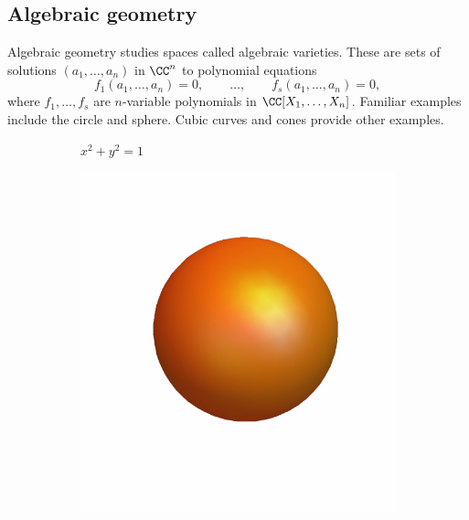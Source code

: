 \documentclass[12pt]{amsart}
\theoremstyle{plain}
\begin{document}
\subsection*{Algebraic geometry}
Algebraic geometry studies spaces called algebraic varieties.
These are sets of solutions $(a_1, \ldots, a_n)$ in $\CC^n$ to polynomial equations
$$f_1(a_1, \ldots, a_n) = 0, \qquad \ldots, \qquad f_s(a_1, \ldots, a_n) = 0,$$
where $f_1, \ldots, f_s$ are  $n$-variable polynomials in $\CC[X_1, \ldots, X_n]$.
Familiar examples include the circle and sphere.
Cubic curves and cones provide other examples.

\begin{figure}[H]
    \centering
    \begin{subfigure}[t]{0.23\textwidth}
        \centering
	\vspace{-0cm}
	  \vspace{0.2cm}
        \caption{$x^2 + y^2 = 1$}
    \end{subfigure}
    \hfill
    \begin{subfigure}[t]{0.23\textwidth}
        \centering
	\vspace*{-0.8cm}
        \includegraphics[width=\linewidth]{../images/orange_sphere}

\end{subfigure}
\end{figure}
\end{document}

